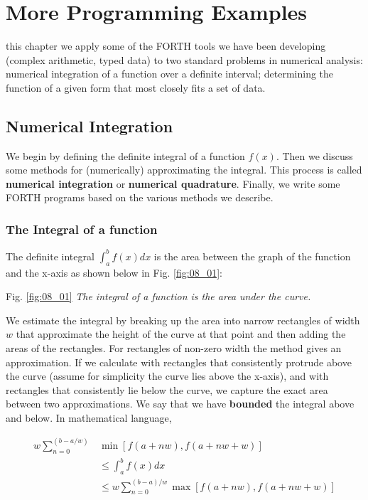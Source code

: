 
\chapter{More Programming Examples}

 this chapter we apply some of the FORTH tools we have been developing (complex arithmetic, typed data) to two standard problems in numerical analysis: numerical integration of a function over a definite interval; determining the function of a given form that most closely fits a set of data.

\section{Numerical Integration}
We begin by defining the definite integral of a function $f(x)$. Then we discuss some methods for (numerically) approximating the integral. This process is called \textbf{numerical integration} or \textbf{numerical quadrature}. Finally, we write some FORTH programs based on the various methods we describe.

\subsection{The Integral of a function}
The definite integral $\int_{a}^{b}f(x) dx$ is the area between the graph of the function and the x-axis as shown below in Fig. \label{fig:08_01} \ref{fig:08_01}:

Fig. \ref{fig:08_01} \textit{The integral of a function is the area under the curve.}

We estimate the integral by breaking up the area into narrow rectangles of width $w$ that approximate the height of the curve at that point and then adding the areas of the rectangles. For rectangles of non-zero width the method gives an approximation. If we calculate with rectangles that consistently protrude above the curve (assume for simplicity the curve lies above the x-axis), and with rectangles that consistently lie below the curve, we capture the exact area between two approximations. We say that we have \textbf{bounded} the integral above and below. In mathematical language,

\begin{equation}
    \begin{split}
    w \sum_{n=0}^{(b-a/w)} & \min[f(a+nw),f(a+nw+w)] \\
    & \leq \int_{a}^{b}f(x) dx \\
    & \leq w \sum_{n=0}^{(b-a)/w} \max[f(a+nw),f(a+nw+w)]
    \end{split}
\end{equation}

